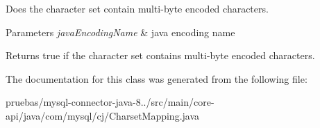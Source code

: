Does the character set contain multi-\/byte encoded characters.


\begin{DoxyParams}{Parameters}
{\em java\+Encoding\+Name} & java encoding name \\
\hline
\end{DoxyParams}
\begin{DoxyReturn}{Returns}
true if the character set contains multi-\/byte encoded characters. 
\end{DoxyReturn}


The documentation for this class was generated from the following file\+:\begin{DoxyCompactItemize}
\item 
pruebas/mysql-\/connector-\/java-\/8../src/main/core-\/api/java/com/mysql/cj/Charset\+Mapping.\+java\end{DoxyCompactItemize}
